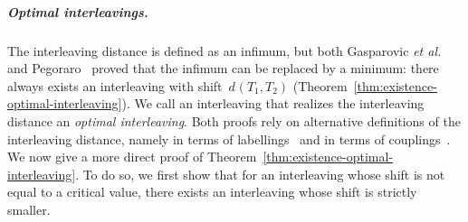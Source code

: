 \documentclass[a4paper,UKenglish, autoref, thm-restate, cleveref]{lipics-v2021}
\newcommand{\etal}{\emph{et al.}}
\newcommand{\intdist}[1]{d^{{#1}}}
\begin{document}
\subparagraph{Optimal interleavings.}
The interleaving distance is defined as an infimum, but both Gasparovic \etal~\cite{gasparovic2019intrinsic} and Pegoraro~\cite{pegoraro2025graph-matching} proved that the infimum can be replaced by a minimum: there always exists an interleaving with shift~$\intdist{}(T_1, T_2)$ (Theorem~\ref{thm:existence-optimal-interleaving}).
We call an interleaving that realizes the interleaving distance an \emph{optimal interleaving}.
Both proofs rely on alternative definitions of the interleaving distance, namely in terms of labellings~\cite{gasparovic2019intrinsic} and in terms of couplings~\cite{pegoraro2025graph-matching}.
We now give a more direct proof of Theorem~\ref{thm:existence-optimal-interleaving}.
To do so, we first show that for an interleaving whose shift is not equal to a critical value, there exists an interleaving whose shift is strictly smaller.
\end{document}
